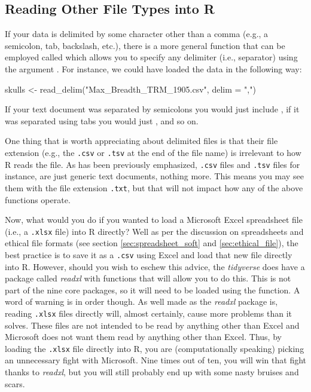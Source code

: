 \subsection{Reading Other File Types into R}

If your data is delimited by some character other than a comma (e.g., a semicolon, tab, backslash, etc.), there is a more general function that can be employed called  which allows you to specify any delimiter (i.e., separator) using the argument . For instance, we could have loaded the  data in the following way:

\begin{inR}
skulls <- read_delim("Max_Breadth_TRM_1905.csv", delim = ",")
\end{inR}

\vspace{1em}

\noindent
If your text document was separated by semicolons you would just include , if it was separated using tabs you would just , and so on. 

One thing that is worth appreciating about delimited files is that their file extension (e.g., the \texttt{.csv} or \texttt{.tsv} at the end of the file name) is irrelevant to how R reads the file. As has been previously emphasized, \texttt{.csv} files and \texttt{.tsv} files for instance, are just generic text documents, nothing more. This means you may see them with the file extension \texttt{.txt}, but that will not impact how any of the above functions operate.

Now, what would you do if you wanted to load a Microsoft Excel spreadsheet file (i.e., a \texttt{.xlsx} file) into R directly? Well as per the discussion on spreadsheets and ethical file formats (see section \ref{sec:spreadsheet_soft} and \ref{sec:ethical_file}), the best practice is to save it as a \texttt{.csv} using Excel and load that new file directly into R. However, should you wish to eschew this advice, the \textit{tidyverse} does have a package called \textit{readxl} with functions that will allow you to do this. This is not part of the nine core packages, so it will need to be loaded using the  function. A word of warning is in order though. As well made as the \textit{readxl} package is, reading \texttt{.xlsx} files directly will, almost certainly, cause more problems than it solves. These files are not intended to be read by anything other than Excel and Microsoft does not want them read by anything other than Excel. Thus, by loading the \texttt{.xlsx} file directly into R, you are (computationally speaking) picking an unnecessary fight with Microsoft. Nine times out of ten, you will win that fight thanks to \textit{readxl}, but you will still probably end up with some nasty bruises and scars.

